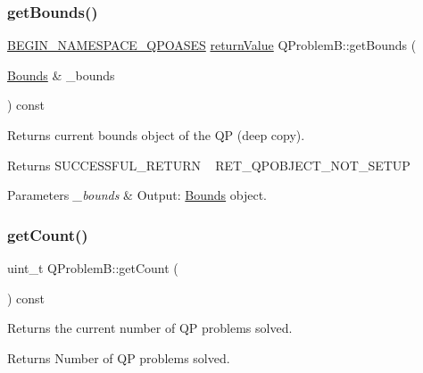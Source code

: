 \subsubsection{\texorpdfstring{get\+Bounds()}{getBounds()}}
{\footnotesize\ttfamily \hyperlink{_types_8hpp_afd127fcb3c8f47975e9fa0ec2bacde52}{B\+E\+G\+I\+N\+\_\+\+N\+A\+M\+E\+S\+P\+A\+C\+E\+\_\+\+Q\+P\+O\+A\+S\+ES} \hyperlink{_message_handling_8hpp_a81d556f613bfbabd0b1f9488c0fa865e}{return\+Value} Q\+Problem\+B\+::get\+Bounds (\begin{DoxyParamCaption}\item[{\hyperlink{class_bounds}{Bounds} \&}]{\+\_\+bounds }\end{DoxyParamCaption}) const\hspace{0.3cm}{\ttfamily [inline]}}

Returns current bounds object of the QP (deep copy). \begin{DoxyReturn}{Returns}
S\+U\+C\+C\+E\+S\+S\+F\+U\+L\+\_\+\+R\+E\+T\+U\+RN ~\newline
 R\+E\+T\+\_\+\+Q\+P\+O\+B\+J\+E\+C\+T\+\_\+\+N\+O\+T\+\_\+\+S\+E\+T\+UP 
\end{DoxyReturn}

\begin{DoxyParams}{Parameters}
{\em \+\_\+bounds} & Output\+: \hyperlink{class_bounds}{Bounds} object. \\
\hline
\end{DoxyParams}
\mbox{\label{class_q_problem_b_a21b332ce4d997b428c2ecec606652777}} 
\subsubsection{\texorpdfstring{get\+Count()}{getCount()}}
{\footnotesize\ttfamily uint\+\_\+t Q\+Problem\+B\+::get\+Count (\begin{DoxyParamCaption}{ }\end{DoxyParamCaption}) const\hspace{0.3cm}{\ttfamily [inline]}}

Returns the current number of QP problems solved. \begin{DoxyReturn}{Returns}
Number of QP problems solved. 
\end{DoxyReturn}
\mbox{\label{class_q_problem_b_aed886c847f0f18259726d758e7d24abe}} 
